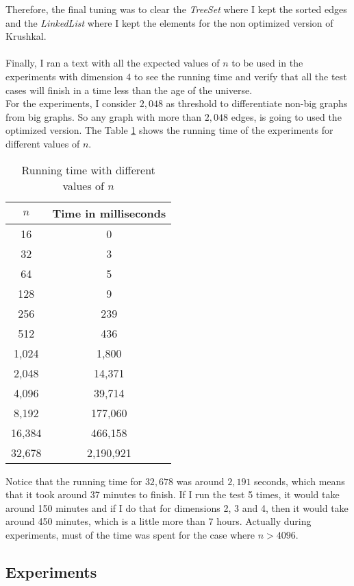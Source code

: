 \documentclass[tikz, 12pt]{scrartcl}
\begin{document}
Therefore, the final tuning was to clear the \textit{TreeSet} where I kept the sorted edges and the \textit{LinkedList} where I kept the elements for the non optimized version of Krushkal.\\ 
\\
Finally, I ran a text with all the expected values of $n$ to be used in the experiments with dimension $4$ to see the running time and verify that all the test cases will finish in a time less than the age of the universe.\\
For the experiments, I consider $2,048$ as threshold to differentiate non-big graphs from big graphs. So any graph with more than $2,048$ edges, is going to used the optimized version. The Table \ref{goodRunningTime} shows the running time of the experiments for different values of $n$.

\begin{table}[ht!]
\centering
\caption{\label{goodRunningTime}Running time with different values of $n$}
\begin{tabular}{|c|c|}
\hline
$n$	&	Time in milliseconds	\\
\hline
16		&              0 \\
32		&	          3\\
64		&		   5\\
128		&              9 \\
256		&		239\\
512		&	      436\\
1,024	&	    1,800\\
2,048	&	  14,371\\
4,096	&	  39,714\\
8,192	&	177,060	\\
16,384	&	466,158\\
32,678	&  2,190,921\\
\hline
\end{tabular}
\end{table}

Notice that the running time for $32,678$ was around $2,191$ seconds, which means that it took around 37 minutes to finish. If I run the test 5 times, it would take around 150 minutes and if I do that for dimensions 2, 3 and 4, then it would take around 450 minutes, which is a little more than 7 hours. Actually during experiments, must of the time was spent for the case where $n > 4096$.

\subsection{Experiments}
\end{document}
